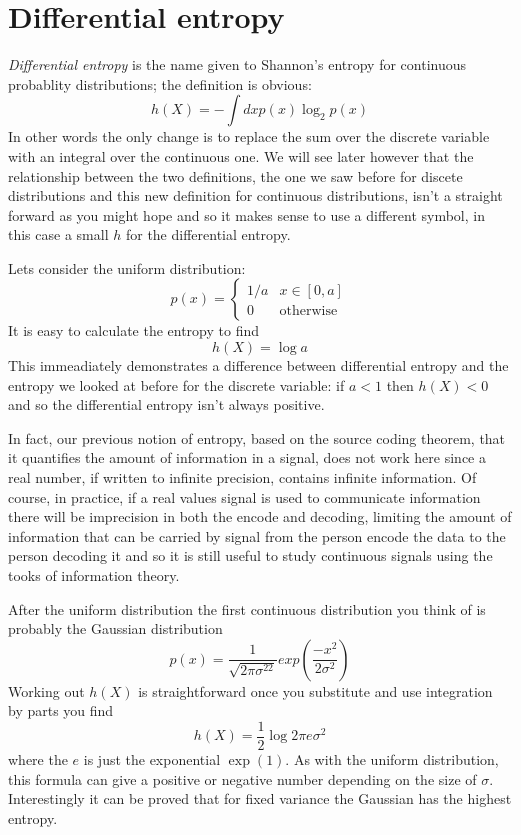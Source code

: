 \documentclass[12pt]{article}
\begin{document}
\section*{Differential entropy} 

\textsl{Differential entropy} is the name given to Shannon's entropy for continuous probablity distributions; the definition is obvious:
\begin{equation}
  h(X)=-\int dx p(x)\log_2{p(x)}
\end{equation}
In other words the only change is to replace the sum over the discrete
variable with an integral over the continuous one. We will see later
however that the relationship between the two definitions, the one we
saw before for discete distributions and this new definition for
continuous distributions, isn't a straight forward as you might hope
and so it makes sense to use a different symbol, in this case a small
$h$ for the differential entropy.

Lets consider the uniform distribution:
\begin{equation}
  p(x)=\left\{\begin{array}{ll}1/a&x\in [0,a]\\0&\mbox{otherwise}\end{array}\right.
\end{equation}
It is easy to calculate the entropy to find
\begin{equation}
  h(X)=\log{a}
\end{equation}
This immeadiately demonstrates a difference between differential
entropy and the entropy we looked at before for the discrete variable:
if $a<1$ then $h(X)<0$ and so the differential entropy isn't always
positive.

In fact, our previous notion of entropy, based on the source coding
theorem, that it quantifies the amount of information in a signal,
does not work here since a real number, if written to infinite
precision, contains infinite information. Of course, in practice, if a
real values signal is used to communicate information there will be
imprecision in both the encode and decoding, limiting the amount of
information that can be carried by signal from the person encode the
data to the person decoding it and so it is still useful to study
continuous signals using the tooks of information theory.

After the uniform distribution the first continuous distribution you
think of is probably the Gaussian distribution
\begin{equation}
  p(x)=\frac{1}{\sqrt{2\pi \sigma^22}}exp\left(\frac{-x^2}{2\sigma^2}\right)
\end{equation}
Working out $h(X)$ is straightforward once you substitute and use integration by parts you find
\begin{equation}
  h(X)=\frac{1}{2}\log{2\pi e \sigma^2}
\end{equation}
where the $e$ is just the exponential $\exp{(1)}$. As with the uniform
distribution, this formula can give a positive or negative number
depending on the size of $\sigma$. Interestingly it can be proved that
for fixed variance the Gaussian has the highest entropy.
\end{document}
